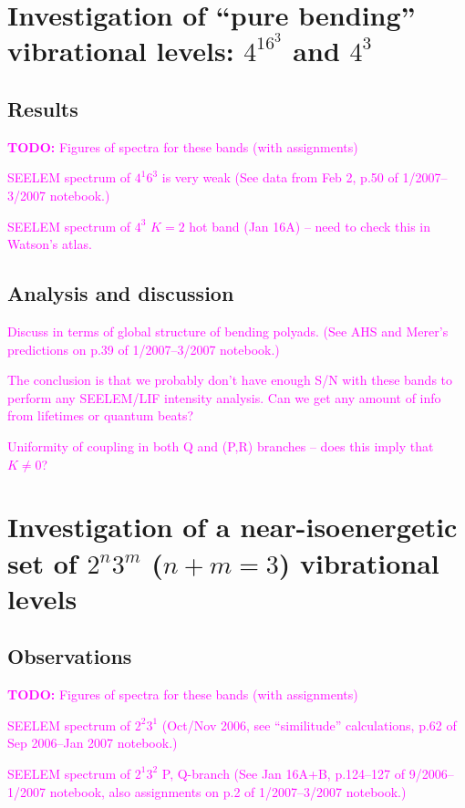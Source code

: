 \documentclass[12pt]{mitthesis}
\newcommand{\TODO} [1]{\textcolor{magenta}{\textbf{TODO:} #1}}
\newcommand{\POINT}[1]{\textcolor{magenta}{#1}}
\begin{document}
\section{Investigation of ``pure bending'' vibrational levels:
  $4^16^3$ and $4^3$}

\subsection{Results}

\TODO{Figures of spectra for these bands (with assignments)}

\POINT{SEELEM spectrum of $4^1 6^3$ is very weak (See data from Feb 2,
  p.50 of 1/2007--3/2007 notebook.)}

\POINT{SEELEM spectrum of $4^3$ $K=2$ hot band (Jan 16A) -- need to
  check this in Watson's atlas.}

\subsection{Analysis and discussion}

\POINT{Discuss in terms of global structure of bending polyads.  (See
  AHS and Merer's predictions on p.39 of 1/2007--3/2007 notebook.)}

\POINT{The conclusion is that we probably don't have enough S/N with
  these bands to perform any SEELEM/LIF intensity analysis.  Can we
  get any amount of info from lifetimes or quantum beats?}

\POINT{Uniformity of coupling in both Q and (P,R) branches -- does
  this imply that $K\ne0$?}


\section{Investigation of a near-isoenergetic set of $2^n3^m$ ($n+m=3$)
  vibrational levels}

\subsection{Observations}

\TODO{Figures of spectra for these bands (with assignments)}

\POINT{SEELEM spectrum of $2^2 3^1$ (Oct/Nov 2006, see ``similitude''
  calculations, p.62 of Sep 2006--Jan 2007 notebook.)}

\POINT{SEELEM spectrum of $2^1 3^2$ P, Q-branch (See Jan 16A+B, p.124--127
  of 9/2006--1/2007 notebook, also assignments on p.2 of
  1/2007--3/2007 notebook.)}
\end{document}
